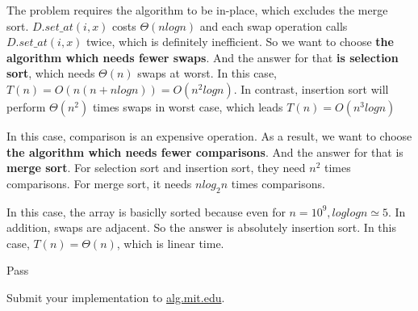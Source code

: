 \documentclass[12pt,twoside]{article}
\begin{document}
\begin{problems}
\begin{problemparts}
\end{problemparts}

\newpage
\problem  %

\begin{problemparts}
\problempart %
The problem requires the algorithm to be in-place, which excludes the merge sort.
$D.set\_at(i, x)$ costs $\Theta(nlogn)$ and each swap operation calls $D.set\_at(i, x)$
twice, which is definitely inefficient. So we want to choose \textbf{the algorithm which 
needs fewer swaps}. And the answer for that \textbf{is selection sort}, which needs $\Theta(n)$
swaps at worst. In this case, $T(n)=O(n(n+nlogn))=O(n^2logn)$. In contrast, insertion
sort will perform $\Theta(n^2)$ times swaps in worst case, which leads $T(n)=O(n^3logn)$

\problempart %
In this case, comparison is an expensive operation. As a result, we want to choose
\textbf{the algorithm which needs fewer comparisons}. And the answer for that is 
\textbf{merge sort}. For selection sort and insertion sort, they need $n^2$ times comparisons.
For merge sort, it needs $nlog_2n$ times comparisons.

\problempart %
In this case, the array is basiclly sorted because even for $n=10^9, loglogn\simeq5$.
In addition, swaps are adjacent. So the answer is absolutely insertion sort.
In this case, $T(n)=\Theta(n)$, which is linear time.

\end{problemparts}

\problem  %
Pass

\problem  %

\newpage
\problem  %

\begin{problemparts}
\problempart %
\problempart %
\problempart Submit your implementation to {\small\url{alg.mit.edu}}.
\end{problemparts}

\end{problems}
\end{document}
